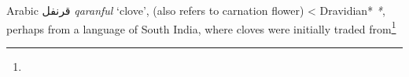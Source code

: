 \begin{etymology}\label{ety:qaranful}
Arabic {قرنفل} \textit{qaranful} `clove', (also refers to carnation flower)
< Dravidian* \textit{*}, perhaps from a language of South India, where cloves were initially traded from\footnote{}
\end{etymology}